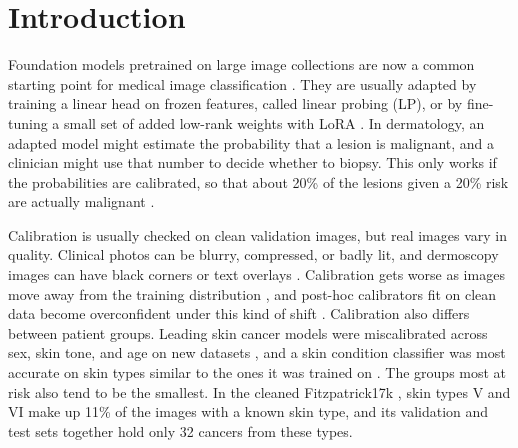 \documentclass[sigconf,nonacm]{acmart}
\begin{document}


\maketitle

\section{Introduction}
\label{sec:intro}

Foundation models pretrained on large image collections are now a common starting point for medical image classification \cite{moor2023generalist,oquab2024dinov2,zhang2025biomedclip}. They are usually adapted by training a linear head on frozen features, called linear probing (LP), or by fine-tuning a small set of added low-rank weights with LoRA \cite{hu2022lora,jin2024fairmedfm}. In dermatology, an adapted model might estimate the probability that a lesion is malignant, and a clinician might use that number to decide whether to biopsy. This only works if the probabilities are calibrated, so that about 20\% of the lesions given a 20\% risk are actually malignant \cite{guo2017calibration}.

Calibration is usually checked on clean validation images, but real images vary in quality. Clinical photos can be blurry, compressed, or badly lit, and dermoscopy images can have black corners or text overlays \cite{disalvo2024medmnistc}. Calibration gets worse as images move away from the training distribution \cite{ovadia2019trust}, and post-hoc calibrators fit on clean data become overconfident under this kind of shift \cite{tomani2021posthoc}. Calibration also differs between patient groups. Leading skin cancer models were miscalibrated across sex, skin tone, and age on new datasets \cite{dominique2025calibration}, and a skin condition classifier was most accurate on skin types similar to the ones it was trained on \cite{groh2021fitzpatrick}. The groups most at risk also tend to be the smallest. In the cleaned Fitzpatrick17k \cite{abhishek2025quality}, skin types V and VI make up 11\% of the images with a known skin type, and its validation and test sets together hold only 32 cancers from these types.
\end{document}
